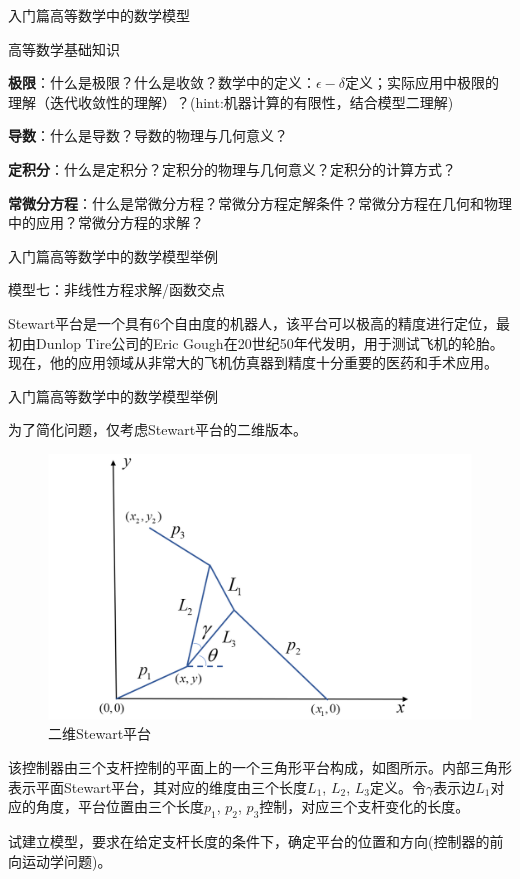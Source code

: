 \documentclass{beamer}
\begin{document}
\begin{frame}{入门篇}{高等数学中的数学模型}
\begin{block}{高等数学基础知识}

\textbf{极限}：什么是极限？什么是收敛？数学中的定义：$\epsilon-\delta$定义；实际应用中极限的理解（迭代收敛性的理解）？(hint:机器计算的有限性，结合模型二理解)

\textbf{导数}：什么是导数？导数的物理与几何意义？

\textbf{定积分}：什么是定积分？定积分的物理与几何意义？定积分的计算方式？

\textbf{常微分方程}：什么是常微分方程？常微分方程定解条件？常微分方程在几何和物理中的应用？常微分方程的求解？
\end{block}
\end{frame}

\begin{frame}{入门篇}{高等数学中的数学模型举例}
\begin{block}{模型七：非线性方程求解/函数交点}

Stewart平台是一个具有6个自由度的机器人，该平台可以极高的精度进行定位，最初由Dunlop Tire公司的Eric Gough在20世纪50年代发明，用于测试飞机的轮胎。现在，他的应用领域从非常大的飞机仿真器到精度十分重要的医药和手术应用。
\end{block}
\end{frame}

\begin{frame}{入门篇}{高等数学中的数学模型举例}

为了简化问题，仅考虑Stewart平台的二维版本。

\begin{figure}
  \centering
  \includegraphics[width=.4\textwidth]{figure//fig02.png} 
  \caption{二维Stewart平台} 
  \label{fig02} 
\end{figure}

该控制器由三个支杆控制的平面上的一个三角形平台构成，如图所示。内部三角形表示平面Stewart平台，其对应的维度由三个长度$L_1$, $L_2$, $L_3$定义。令$\gamma$表示边$L_1$对应的角度，平台位置由三个长度$p_1$, $p_2$, $p_3$控制，对应三个支杆变化的长度。

试建立模型，要求在给定支杆长度的条件下，确定平台的位置和方向(控制器的前向运动学问题)。

\end{frame}
\end{document}
